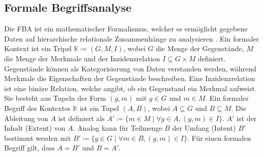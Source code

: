 \subsection{Formale Begriffsanalyse}
Die \ac{FBA} ist ein mathematischer Formalismus, welcher es ermöglicht gegebene Daten auf hierarchische relationale Zusammenhänge zu analysieren \cite{formale-begriffsanalyse, formal-concept-analysis-wille}.
Ein formaler Kontext ist ein Tripel $\mathbb{K} \coloneqq (G, M, I)$, wobei $G$ die Menge der Gegenstände, $M$ die Menge der Merkmale und der Inzidenzrelation $I \subseteq G \times M$ definiert.
Gegenstände können als Kategorisierung von Daten verstanden werden, während Merkmale die Eigenschaften der Gegenstände beschreiben.
Eine Inzidenzrelation ist eine binäre Relation, welche angibt, ob ein Gegenstand ein Merkmal aufweist.
Sie besteht aus Tupeln der Form $(g,m)$ mit $g \in G$ und $m \in M$.
Ein formaler Begriff des Kontextes $\mathbb{K}$ ist ein Tupel $(A,B)$, wobei $A \subseteq G$ und $B \subseteq M$.
Die Ableitung von $A$ ist definiert als $A' \coloneqq \{m \in M \mid \forall g \in A, (g,m) \in I\}$.
$A'$ ist der Inhalt (Extent) von $A$.
Analog kann für Teilmenge $B$ der Umfang (Intent) $B'$ bestimmt werden mit $B' \coloneqq \{g \in G \mid \forall m \in B, (g,m) \in I\}$.
Für einen formalen Begriff gilt, dass $A = B'$ und $B = A'$.\\

\begin{center}
    \begin{table}[!ht]
        \centering
        \caption{Kreuztabelle - Nahrungsmittel}
        \label{table:fca-food}
    \end{table}
\end{center}

